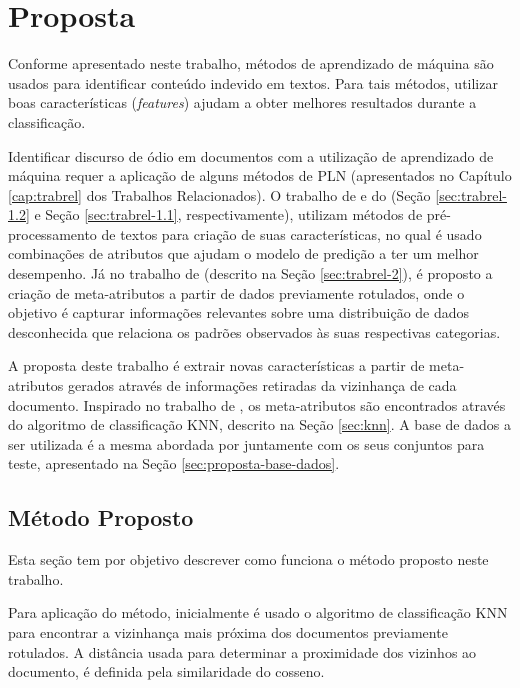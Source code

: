 \chapter{Proposta}\label{cap:proposta}

Conforme apresentado neste trabalho, métodos de aprendizado de máquina são usados  para identificar conteúdo indevido em textos. Para tais métodos, utilizar boas características (\textit{features}) ajudam a obter melhores resultados durante a classificação.

Identificar discurso de ódio em documentos com a utilização de aprendizado de máquina requer a aplicação de alguns métodos de PLN (apresentados no Capítulo \ref{cap:trabrel} dos Trabalhos Relacionados). O trabalho de \cite{davidson2017automated} e do \cite{nobata2016abusive} (Seção \ref{sec:trabrel-1.2} e  Seção \ref{sec:trabrel-1.1}, respectivamente), utilizam métodos de pré-processamento de textos para criação de suas características, no qual é usado combinações de  atributos que ajudam o modelo de predição a ter um melhor desempenho. Já no trabalho de \cite{canutoestudo} (descrito na Seção \ref{sec:trabrel-2}), é proposto a criação de meta-atributos a partir de dados previamente rotulados, onde o objetivo é capturar informações  relevantes sobre uma distribuição de dados desconhecida
que relaciona os padrões observados às suas respectivas categorias. 

A proposta deste trabalho é extrair novas características a partir de meta-atributos gerados através de informações retiradas da vizinhança de cada documento. Inspirado no trabalho de \cite{canutoestudo}, os meta-atributos são encontrados através do algoritmo de classificação KNN, descrito na Seção \ref{sec:knn}. A base de dados a ser utilizada é a mesma abordada por \cite{Pelle2017} juntamente com os seus conjuntos para teste, apresentado na Seção \ref{sec:proposta-base-dados}.

\section{Método Proposto}
Esta seção tem por objetivo descrever como funciona o método proposto neste trabalho. 

Para aplicação do método, inicialmente é usado o algoritmo de classificação KNN para encontrar a vizinhança mais próxima dos documentos previamente rotulados. A distância usada para determinar a proximidade dos vizinhos ao documento, é definida pela similaridade do cosseno. 

